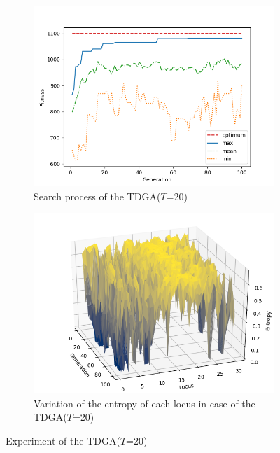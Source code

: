 \documentclass[onecolumn]{ujarticle}   %
\begin{document}
	\begin{figure}[h]
		\vspace{-2mm}
		\begin{subfigure}{0.49\columnwidth}
			\includegraphics[width=1.0\columnwidth]{figure/knapsackTDGA_stats_T_20_mut_001_Np_32.png}
			\caption{Search process of the TDGA($T$=20)}
			\label{fig:searchprocessT20}
		\end{subfigure}
		\begin{subfigure}{0.49\columnwidth}
			\includegraphics[width=1.0\columnwidth]{figure/knapsackTDGA_T_20_mut_001_Np_32.png}
			\caption{Variation of the entropy of each locus in case of the TDGA($T$=20)}
			\label{fig:entropyT20}
		\end{subfigure}
		\caption{Experiment of the TDGA($T$=20)}
	\end{figure}
\end{document}
